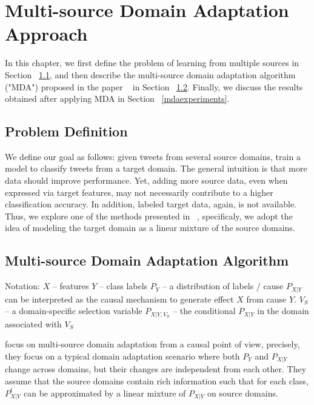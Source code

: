 \cleardoublepage

\chapter{Multi-source Domain Adaptation Approach}
\label{mdachapter}

In this chapter, we first define the problem of learning from multiple sources in Section ~\ref{mdaproblemdefinitions}, and then describe the multi-source domain adaptation algorithm ("MDA") proposed in the paper ~\citep{mda} in Section ~\ref{mdaalg}. Finally, we discuss the results obtained after applying MDA in Section ~\ref{mdaexperiments}.


\section{Problem Definition}
\label{mdaproblemdefinitions}

We define our goal as follows: given tweets from several source domains, train a model to classify tweets from a target domain. The general intuition is that more data should improve performance. Yet, adding more source data, even when expressed via target features, may not necessarily contribute to a higher classification accuracy. In addition, labeled target data, again, is not available. Thus, we explore one of the methods presented in ~\citep{mda}, specificaly, we adopt the idea of modeling the target domain as a linear mixture of the source domains. 

\section{Multi-source Domain Adaptation Algorithm}
\label{mdaalg}

Notation: 
$X$ -- features
$Y$ -- class labels
$P_Y$ -- a distribution of labels / cause
$P_{X|Y}$ can be interpreted as the causal mechanism to generate effect $X$ from cause $Y$. 
$V_S$ -- a domain-specific selection variable
$P_{X|Y, V_S}$ -- the conditional $P_{X|Y}$ in the domain associated with $V_S$ 

\citep{mda} focus on multi-source domain adaptation from a causal point of view, precisely, they focus on a typical domain adaptation scenario where both $P_Y$ and $P_{X|Y}$ change across domains, but their changes are independent from each other. They assume that the source domains contain rich information such that for each class, $P_{X|Y}^t$ can be approximated by a linear mixture of $P_{X|Y}$ on source domains. 

